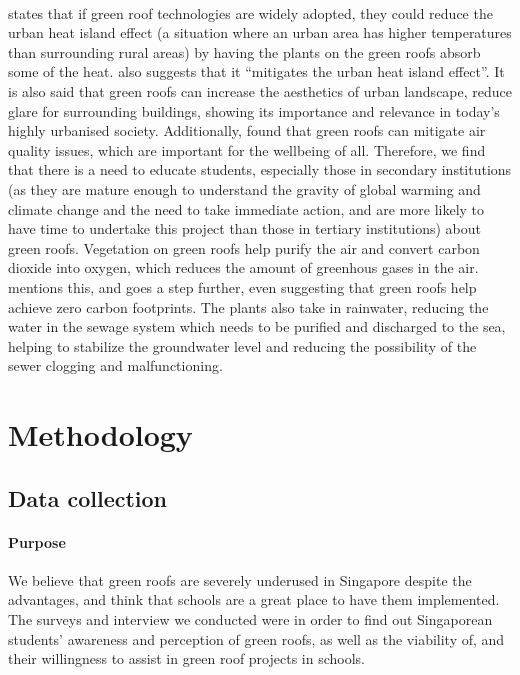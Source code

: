 \documentclass{article}
\begin{document}
\begin{multicols}{2}
  \paragraph{}
  \cite{energeff} states that if green roof technologies are
  widely adopted, they could reduce the urban heat island effect
  (a situation where an urban area has higher temperatures
  than surrounding rural areas) by having the plants on the
  green roofs absorb some of the heat. \cite{HKGreenRoofGL}
  also suggests that it “mitigates the urban heat island
  effect”. It is also said that green roofs can increase the
  aesthetics of urban landscape, reduce glare for surrounding
  buildings, showing its importance and relevance in today's
  highly urbanised society. Additionally, \cite{HKGreenRoofGL}
  found that green roofs can mitigate air quality issues, which
  are important for the wellbeing of all. Therefore, we find
  that there is a need to educate students, especially those in
  secondary institutions (as they are mature enough to understand
  the gravity of global warming and climate change and the need
  to take immediate action, and are more likely to have time to
  undertake this project than those in tertiary institutions)
  about green roofs.  Vegetation on green roofs help purify the
  air and convert carbon dioxide into oxygen, which reduces
  the amount of greenhous gases in the air. \parencite{energeff}
  mentions this, and \cite{CommAwareGBSyd} goes a step further,
  even suggesting that green roofs help achieve zero carbon
  footprints. The plants also take in rainwater, reducing the
  water in the sewage system which needs to be purified and
  discharged to the sea, helping to stabilize the groundwater
  level and reducing the possibility of the sewer clogging and
  malfunctioning.



  \section{Methodology}
  \subsection{Data collection}
  \paragraph{Purpose} We believe that green roofs are severely underused
  in Singapore despite the advantages, and think that schools are a
  great place to have them implemented. The surveys and interview we
  conducted were in order to find out Singaporean students’ awareness
  and perception of green roofs, as well as the viability of, and their
  willingness to assist in green roof projects in schools.


\end{multicols}
\end{document}
